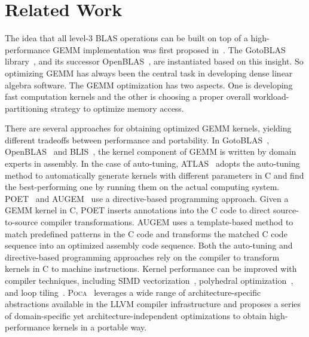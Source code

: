 \section{Related Work}\label{sec:related}
The idea that all level-3 BLAS operations can be built 
on top of 
a high-performance GEMM implementation was first proposed
in~\cite{gemmbased1,gemmbased2}.
The GotoBLAS library~\cite{gotoblas}, and its successor OpenBLAS~\cite{openblas},
are instantiated based on this insight.
So optimizing GEMM has always been the central task in developing
dense linear algebra software.
The GEMM optimization has two aspects.
One is developing fast computation kernels and
the other is choosing a proper overall workload-partitioning  strategy
to optimize memory access.


There are several approaches for obtaining optimized GEMM kernels,
yielding different tradeoffs between performance and portability.
In GotoBLAS~\cite{gotoblas}, OpenBLAS~\cite{openblas} and BLIS~\cite{blis},
the kernel component of GEMM is 
written by domain experts in assembly.
In the case of auto-tuning,
ATLAS~\cite{atlas} adopts the auto-tuning method to
automatically generate kernels with different parameters
in C and find the best-performing one by running them
on the actual computing system.
POET~\cite{poet,poetcgo,poetmicro} and AUGEM~\cite{augem} use a 
directive-based programming approach.
Given a GEMM kernel in C, POET inserts annotations into
the C code to direct source-to-source compiler transformations.
AUGEM uses a template-based method to match
predefined patterns in the C code and transforms the matched
C code sequence into an optimized assembly code sequence.
Both the auto-tuning and directive-based programming approaches
rely on the compiler to transform kernels in C to machine instructions.
Kernel performance can be improved with compiler techniques,
including SIMD vectorization~\cite{Larsen:2000,Zhou:2016,Zhou:2016b,
  Eichenberger2004,GCCSLP2007},
polyhedral optimization~\cite{Bondhugula2008A,Kong:2013}, 
and loop tiling~\cite{Lam1991,Spampinato:2014,Xue00}.
\textsc{Poca}~\cite{poca} leverages a wide range of architecture-specific
abstractions available in the LLVM compiler infrastructure
and proposes a series of domain-specific yet architecture-independent optimizations
to obtain high-performance kernels in a portable way.

